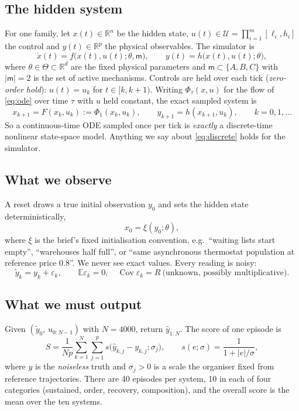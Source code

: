 \documentclass[11pt]{article}
\theoremstyle{plain}
\theoremstyle{definition}
\theoremstyle{remark}
\newcommand{\R}{\mathbb{R}}
\newcommand{\E}{\mathbb{E}}
\newcommand{\abs}[1]{\left\lvert #1 \right\rvert}
\begin{document}
\subsection{The hidden system}
For one family, let $x(t)\in\R^n$ be the hidden state, $u(t)\in\mathcal U=\prod_{i=1}^{m}[\ell_i,h_i]$ the control and $y(t)\in\R^p$ the physical observables. The simulator is
\begin{equation}\label{eq:ode}
\dot x(t) = f\big(x(t),u(t);\theta,\mathsf m\big),\qquad y(t)=h\big(x(t),u(t);\theta\big),
\end{equation}
where $\theta\in\Theta\subset\R^d$ are the fixed physical parameters and $\mathsf m\subset\{A,B,C\}$ with $|\mathsf m|=2$ is the set of active mechanisms. Controls are held over each tick (\emph{zero-order hold}): $u(t)=u_k$ for $t\in[k,k+1)$. Writing $\Phi_\tau(x,u)$ for the flow of \eqref{eq:ode} over time $\tau$ with $u$ held constant, the exact sampled system is
\begin{equation}\label{eq:discrete}
x_{k+1}=F(x_k,u_k):=\Phi_1(x_k,u_k),\qquad y_{k+1}=h(x_{k+1},u_k),\qquad k=0,1,\dots
\end{equation}
So a continuous-time ODE sampled once per tick is \emph{exactly} a discrete-time nonlinear state-space model. Anything we say about \eqref{eq:discrete} holds for the simulator.

\subsection{What we observe}
A reset draws a true initial observation $y_0$ and sets the hidden state deterministically,
\begin{equation}\label{eq:reset}
x_0=\xi(y_0;\theta),
\end{equation}
where $\xi$ is the brief's fixed initialisation convention, e.g.\ ``waiting lists start empty'', ``warehouses half full'', or ``same asynchronous thermostat population at reference price 0.8''. We never see exact values. Every reading is noisy:
\begin{equation}
\tilde y_k = y_k + \varepsilon_k,\qquad \E\varepsilon_k=0,\quad \operatorname{Cov}\varepsilon_k=R\ \text{(unknown, possibly multiplicative)}.
\end{equation}

\subsection{What we must output}
Given $(\tilde y_0,\,u_{0:N-1})$ with $N=4000$, return $\hat y_{1:N}$. The score of one episode is
\begin{equation}\label{eq:score}
S=\frac{1}{Np}\sum_{k=1}^{N}\sum_{j=1}^{p} s\big(\hat y_{k,j}-y_{k,j};\sigma_j\big),\qquad s(e;\sigma)=\frac{1}{1+\abs{e}/\sigma},
\end{equation}
where $y$ is the \emph{noiseless} truth and $\sigma_j>0$ is a scale the organiser fixed from reference trajectories. There are 40 episodes per system, 10 in each of four categories (sustained, order, recovery, composition), and the overall score is the mean over the ten systems.
\end{document}
